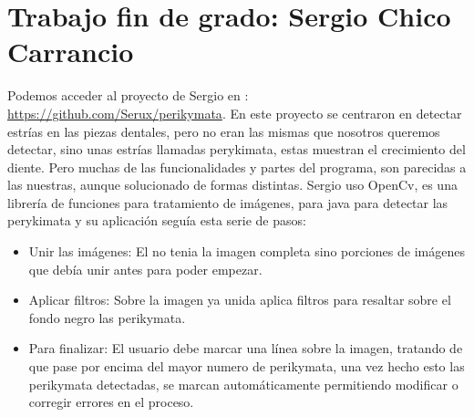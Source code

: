 \section{Trabajo fin de grado: Sergio Chico Carrancio}
Podemos acceder al proyecto de Sergio en : \url{https://github.com/Serux/perikymata}.
En este proyecto se centraron en detectar estrías en las piezas dentales, pero no eran las mismas que nosotros queremos detectar, sino unas estrías llamadas perykimata, estas muestran el crecimiento del diente. Pero muchas de las funcionalidades y partes del programa, son parecidas a las nuestras, aunque solucionado de formas distintas.
Sergio uso OpenCv, es una librería de funciones para tratamiento de imágenes, para java para detectar las perykimata y su aplicación seguía esta serie de pasos:
\begin{itemize}
\item Unir las imágenes: El no tenia la imagen completa sino porciones de imágenes que debía unir antes para poder empezar.
\item Aplicar filtros: Sobre la imagen ya unida aplica filtros para resaltar sobre el fondo negro las perikymata.
\item Para finalizar: El usuario debe marcar una línea sobre la imagen, tratando de que pase por encima del mayor numero de perikymata, una vez hecho esto las perikymata detectadas, se marcan automáticamente permitiendo modificar o corregir errores en el proceso.
\end{itemize}
